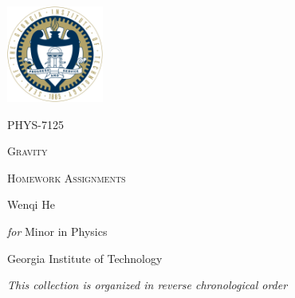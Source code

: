 \documentclass[10pt]{article}
\begin{document}
\begin{titlepage}
	\centering
	\par
	\vspace{5cm}
	\includegraphics[width=120px]{logo.png}\par
	\vspace{3cm}
	{\scshape\Large PHYS-7125\par}
	{\Huge\scshape Gravity \par}
	\vspace{0.3cm}
	{\scshape\LARGE Homework Assignments \par}
	\vspace{2cm}
	\vfill
	{\Large Wenqi He\par}
	\vspace{0.3cm}
	{\Large \textit{for} Minor in Physics\par}	
	\vspace{0.3cm}
	{\Large Georgia Institute of Technology \par}
	\vfill
	{\large\itshape This collection is organized in reverse chronological order}
\end{titlepage}
\end{document}
